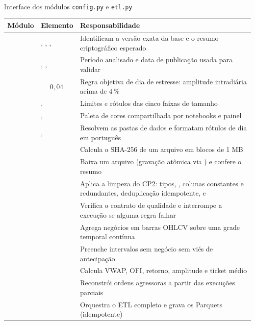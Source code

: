 \begin{quadro}[htbp]
\caption{\label{qua:modulos1}Interface dos módulos \texttt{config.py} e \texttt{etl.py}}
\begin{corpotabela}
\begin{tabularx}{\textwidth}{|L{1.9cm}|L{4.6cm}|Y|}
\hline
\textbf{Módulo} & \textbf{Elemento} & \textbf{Responsabilidade} \\ \hline
{}
 & , , ,  & Identificam a versão exata da base e o resumo criptográfico esperado \\ 
 & , ,  & Período analisado e data de publicação usada para validar  \\ 
 &  $= 0,04$ & Regra objetiva de dia de estresse: amplitude intradiária acima de 4\,\% \\ 
 & ,  & Limites e rótulos das cinco faixas de tamanho \\ 
 & ,  & Paleta de cores compartilhada por notebooks e painel \\ 
 & ,  & Resolvem as pastas de dados e formatam rótulos de dia em português \\ \hline
{}
 &  & Calcula o SHA-256 de um arquivo em blocos de 1 MB \\ 
 &  & Baixa um arquivo (gravação atômica via ) e confere o resumo \\ 
 &  & Aplica a limpeza do CP2: tipos, , colunas constantes e redundantes, deduplicação idempotente,  e  \\ 
 &  & Verifica o contrato de qualidade e interrompe a execução se alguma regra falhar \\ 
 &  & Agrega negócios em barras OHLCV sobre uma grade temporal contínua \\ 
 &  & Preenche intervalos sem negócio sem viés de antecipação \\ 
 &  & Calcula VWAP, OFI, retorno, amplitude e ticket médio \\ 
 &  & Reconstrói ordens agressoras a partir das execuções parciais \\ 
 &  & Orquestra o ETL completo e grava os Parquets (idempotente) \\ \hline
\end{tabularx}
\end{corpotabela}
\fonteautores[Elaborado]
\end{quadro}

